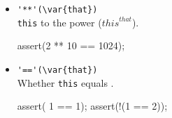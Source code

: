 \begin{itemize}
\item \lstinline|'**'(\var{that})|\\
  \lstinline|this| to the  power (${this}^{that}$).
\begin{urbiscript}[firstnumber=last]
assert(2 ** 10 == 1024);
\end{urbiscript}

\item \lstinline|'=='(\var{that})|\\
  Whether \lstinline|this| equals .
\begin{urbiscript}[firstnumber=last]
assert(  1 == 1);
assert(!(1 == 2));
\end{urbiscript}
\end{itemize}


